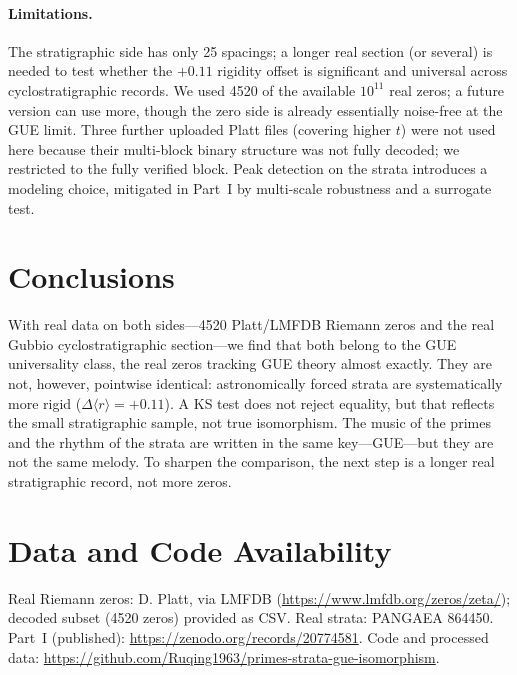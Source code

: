\documentclass[12pt,a4paper]{article}
\begin{document}
\paragraph{Limitations.} The stratigraphic side has only 25 spacings; a longer real section (or several) is needed to test whether the $+0.11$ rigidity offset is significant and universal across cyclostratigraphic records. We used 4520 of the available $10^{11}$ real zeros; a future version can use more, though the zero side is already essentially noise-free at the GUE limit. Three further uploaded Platt files (covering higher $t$) were not used here because their multi-block binary structure was not fully decoded; we restricted to the fully verified block. Peak detection on the strata introduces a modeling choice, mitigated in Part~I by multi-scale robustness and a surrogate test.

\section{Conclusions}
With real data on both sides---4520 Platt/LMFDB Riemann zeros and the real Gubbio cyclostratigraphic section---we find that both belong to the GUE universality class, the real zeros tracking GUE theory almost exactly. They are not, however, pointwise identical: astronomically forced strata are systematically more rigid ($\Delta\langle r\rangle=+0.11$). A KS test does not reject equality, but that reflects the small stratigraphic sample, not true isomorphism. The music of the primes and the rhythm of the strata are written in the same key---GUE---but they are not the same melody. To sharpen the comparison, the next step is a longer real stratigraphic record, not more zeros.

\section*{Data and Code Availability}
Real Riemann zeros: D. Platt, via LMFDB (\url{https://www.lmfdb.org/zeros/zeta/}); decoded subset (4520 zeros) provided as CSV. Real strata: PANGAEA 864450. Part~I (published): \url{https://zenodo.org/records/20774581}. Code and processed data: \url{https://github.com/Ruqing1963/primes-strata-gue-isomorphism}.
\end{document}
